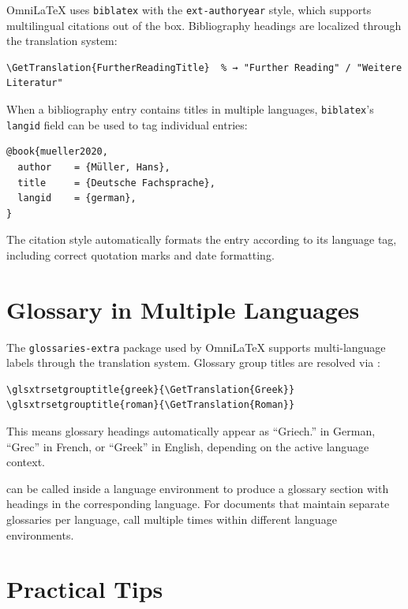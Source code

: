 OmniLaTeX uses \texttt{biblatex} with the \texttt{ext-authoryear} style,
which supports multilingual citations out of the box.  Bibliography
headings are localized through the translation system:

\begin{verbatim}
\GetTranslation{FurtherReadingTitle}  % → "Further Reading" / "Weitere Literatur"
\end{verbatim}

When a bibliography entry contains titles in multiple languages,
\texttt{biblatex}'s \texttt{langid} field can be used to tag individual
entries:

\begin{verbatim}
@book{mueller2020,
  author    = {Müller, Hans},
  title     = {Deutsche Fachsprache},
  langid    = {german},
}
\end{verbatim}

The citation style automatically formats the entry according to its
language tag, including correct quotation marks and date formatting.

\section{Glossary in Multiple Languages}

The \texttt{glossaries-extra} package used by OmniLaTeX supports
multi-language labels through the translation system.  Glossary group
titles are resolved via :

\begin{verbatim}
\glsxtrsetgrouptitle{greek}{\GetTranslation{Greek}}
\glsxtrsetgrouptitle{roman}{\GetTranslation{Roman}}
\end{verbatim}

This means glossary headings automatically appear as
``Griech.'' in German, ``Grec'' in French, or ``Greek'' in English,
depending on the active language context.

 can be called inside a language environment to
produce a glossary section with headings in the corresponding language.
For documents that maintain separate glossaries per language, call
 multiple times within different language
environments.

\section{Practical Tips}

